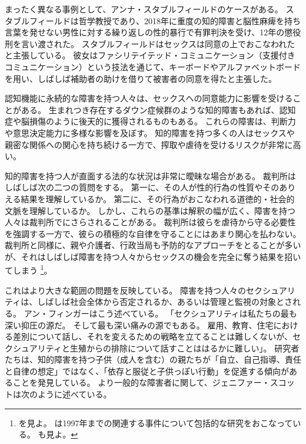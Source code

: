 \documentclass[paper=a4,book,openany]{jlreq} \usepackage{mystyle}
\begin{document}
まったく異なる事例として、アンナ・スタブルフィールドのケースがある。
スタブルフィールドは哲学教授であり、2018年に重度の知的障害と脳性麻痺を持ち言葉を発せない男性に対する繰り返しの性的暴行で有罪判決を受け、12年の懲役刑を言い渡された。
スタブルフィールドはセックスは同意の上でおこなわれたと主張している。
彼女はファシリテイテッド・コミュニケーション（支援付きコミュニケーション）という技法を通じて、キーボードやアルファベットボードを用い、しばしば補助者の助けを借りて被害者の同意を得たと主張した\citep{engber15:_stran_case_anna_stubb}。

認知機能に永続的な障害を持つ人々は、セックスへの同意能力に影響を受けることがある。
生まれつき存在するダウン症候群のような知的障害もあれば、認知症や脳損傷のように後天的に獲得されるものもある。
これらの障害は、判断力や意思決定能力に多様な影響を及ぼす。
知的障害を持つ多くの人はセックスや親密な関係への関心を持ち続ける一方で、搾取や虐待を受けるリスクが非常に高い\citep{justice16:_crime_person_disab}。

知的障害を持つ人が直面する法的な状況は非常に曖昧な場合がある。
裁判所はしばしば次の二つの質問をする。
第一に、その人が性的行為の性質やそのありえる結果を理解しているか。
第二に、その行為がおこなわれる道徳的・社会的文脈を理解しているか。
しかし、これらの基準は解釈の幅が広く、障害を持つ人々は裁判所でにさらされることがある。
裁判所は彼らを虐待から守る必要性を強調する一方で、彼らの積極的な自律を守ることにはあまり関心を払わない。
裁判所と同様に、親や介護者、行政当局も予防的なアプローチをとることが多いが、それはしばしば障害を持つ人々からセックスの機会を完全に奪う結果を招いてしまう\nocite{appel10:_sex_right_disab} \footnote{\citet{appel10:_sex_right_disab}を見よ。
\citet{denno97:_sexual_rape_mental_retar}は1997年までの関連する事件について包括的な研究をおこなっている。
\citet[p.86]{kulick15:_lonel_its_oppos}も見よ。
}。

これはより大きな範囲の問題を反映している。
障害を持つ人々のセクシュアリティは、しばしば社会全体から否定されるか、あるいは管理と監視の対象とされる。
アン・フィンガーはこう述べている。
「セクシュアリティは私たちの最も深い抑圧の源だ。
そして最も深い痛みの源でもある。
雇用、教育、住宅における差別について話し、それを変えるための戦略を立てることは難しくないが、セクシュアリティと生殖からの排除について話すことははるかに難しい」\citep[p.9]{finger92:_forbid_fruit}。
研究者たちは、知的障害を持つ子供（成人を含む）の親たちが「自立、自己指導、責任と自律の想定」ではなく、「依存と服従と子供っぽい行動」を促進する傾向があることを発見している\citep[p.196]{mill10:_negot_auton_famil}。
より一般的な障害者に関して、ジェニファー・スコットは次のように述べている。
\end{document}
